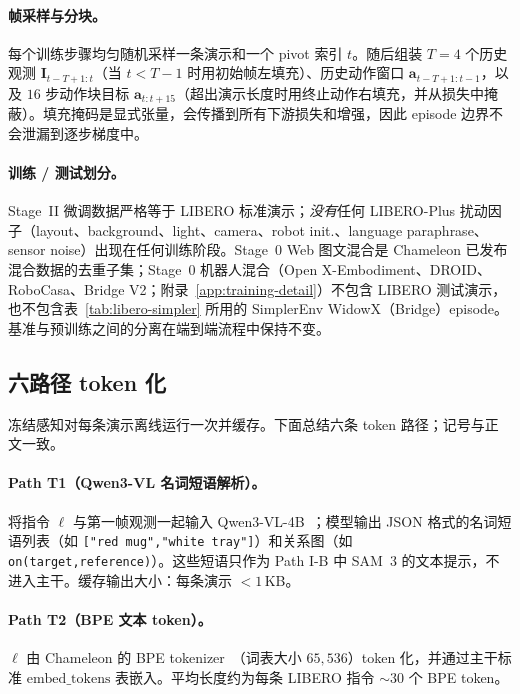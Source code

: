 \paragraph{帧采样与分块。}
每个训练步骤均匀随机采样一条演示和一个 pivot 索引 $t$。随后组装 $T\!=\!4$ 个历史观测 $\mathbf{I}_{t-T+1:t}$（当 $t\!<\!T-1$ 时用初始帧左填充）、历史动作窗口 $\mathbf{a}_{t-T+1:t-1}$，以及 $16$ 步动作块目标 $\mathbf{a}_{t:t+15}$（超出演示长度时用终止动作右填充，并从损失中掩蔽）。填充掩码是显式张量，会传播到所有下游损失和增强，因此 episode 边界不会泄漏到逐步梯度中。

\paragraph{训练 / 测试划分。}
Stage~II 微调数据严格等于 LIBERO 标准演示；\emph{没有}任何 LIBERO-Plus 扰动因子（layout、background、light、camera、robot init.、language paraphrase、sensor noise）出现在任何训练阶段。Stage~0 Web 图文混合是 Chameleon 已发布混合数据的去重子集；Stage~0 机器人混合（Open X-Embodiment、DROID、RoboCasa、Bridge V2；附录~\ref{app:training-detail}）不包含 LIBERO 测试演示，也不包含表~\ref{tab:libero-simpler} 所用的 SimplerEnv WidowX（Bridge）episode。基准与预训练之间的分离在端到端流程中保持不变。

\subsection*{六路径 token 化}

冻结感知对每条演示离线运行一次并缓存。下面总结六条 token 路径；记号与正文一致。

\paragraph{Path T1（Qwen3-VL 名词短语解析）。}
将指令 $\ell$ 与第一帧观测一起输入 Qwen3-VL-4B~\citep{qwen3vl}；模型输出 JSON 格式的名词短语列表（如 \texttt{["red mug","white tray"]}）和关系图（如 \texttt{on(target,reference)}）。这些短语只作为 Path I-B 中 SAM~3 的文本提示，不进入主干。缓存输出大小：每条演示 $<\!1$\,KB。

\paragraph{Path T2（BPE 文本 token）。}
$\ell$ 由 Chameleon 的 BPE tokenizer~\citep{chameleon}（词表大小 $65{,}536$）token 化，并通过主干标准 $\mathrm{embed\_tokens}$ 表嵌入。平均长度约为每条 LIBERO 指令 $\sim\!30$ 个 BPE token。

